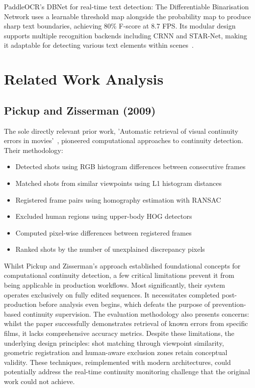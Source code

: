 PaddleOCR's DBNet for real-time text detection: The Differentiable Binarisation Network uses a learnable threshold map alongside the probability map to produce sharp text boundaries, achieving 80\% F-score at 8.7 FPS. Its modular design supports multiple recognition backends including CRNN and STAR-Net, making it adaptable for detecting various text elements within scenes~\cite{kuang2021}.

\section{Related Work Analysis}

\subsection{Pickup and Zisserman (2009)}

The sole directly relevant prior work, 'Automatic retrieval of visual continuity errors in movies'~\cite{pickup2009}, pioneered computational approaches to continuity detection. Their methodology:

\begin{itemize}
\item Detected shots using RGB histogram differences between consecutive frames
\item Matched shots from similar viewpoints using L1 histogram distances
\item Registered frame pairs using homography estimation with RANSAC
\item Excluded human regions using upper-body HOG detectors
\item Computed pixel-wise differences between registered frames
\item Ranked shots by the number of unexplained discrepancy pixels
\end{itemize}

Whilst Pickup and Zisserman's approach established foundational concepts for computational continuity detection, a few critical limitations prevent it from being applicable in production workflows. Most significantly, their system operates exclusively on fully edited sequences. It necessitates completed post-production before analysis even begins, which defeats the purpose of prevention-based continuity supervision. The evaluation methodology also presents concerns: whilst the paper successfully demonstrates retrieval of known errors from specific films, it lacks comprehensive accuracy metrics. Despite these limitations, the underlying design principles: shot matching through viewpoint similarity, geometric registration and human-aware exclusion zones retain conceptual validity. These techniques, reimplemented with modern architectures, could potentially address the real-time continuity monitoring challenge that the original work could not achieve.

